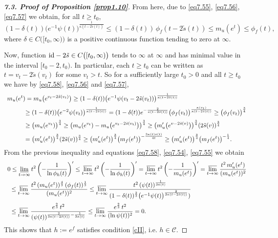 \documentclass[11pt, oneside]{amsart}
\begin{document}
\begin{proof}[{\bf 7.3. Proof of Proposition \ref{prop1.10}}]
From here, due to \eqref{eq7.55},  \eqref{eq7.56}, \eqref{eq7.57} we obtain, for all $t\ge t_0$, 
\begin{equation}\label{eq7.58}
(1-\delta(t))\bigl(e^{-1}\psi(t)\bigr)^{\frac{1}{\kappa(t-2\tilde s(t))}}\le (1-\delta(t))\,\phi_f(t-2\tilde s(t) )\le m_u(e^t)\le \phi_f(t),
\end{equation}
where $\delta\in C\bigl([t_0,\infty)\bigr)$ is a positive continuous function tending to zero at $\infty$.

Now, function ${\rm id}-2\tilde s\in C\bigl([t_0,\infty)\bigr)$ tends to $\infty$ at $\infty$ and has minimal value in the interval $[t_0-2, t_0)$. In particular, each $t\ge t_0$ can be written as $t=v_t-2\tilde s(v_t)$ for some $v_t> t$. So for a sufficiently large $t_0>0$ and all $t\ge t_0$ we have by \eqref{eq7.58}, \eqref{eq7.56} and \eqref{eq7.57},
\[
\begin{array}{l}
\displaystyle
m_u(e^t)=m_u\bigl(e^{v_t-2\tilde s(v_t)}\bigr)\ge 
(1-\delta(t))\bigl(e^{-1}\psi(v_t-2\tilde s(v_t))\bigr)^{\frac{1}{\kappa(t-2\tilde s(t))}}\medskip\\
\displaystyle \quad \qquad\ge (1-\delta(t))\bigl(e^{-2}\psi(v_t)\bigr)^{\frac{1}{\kappa(t-2\tilde s(t))}}=(1-\delta(t))e^{-\frac{2}{\kappa(t-2\tilde s(t))}}\bigr(\phi_f(v_t)\bigr)^{\frac{\kappa(v_t)}{\kappa(t-2\tilde s(t))}}\ge
\bigl(\phi_f(v_t)\bigr)^{\frac 34}\medskip\\
\displaystyle \quad\qquad\ge \bigl(m_u(e^{v_t})\bigr)^{\frac 34}\ge \bigl(m_u(e^{v_t})-m_u\bigl(e^{v_t-2\tilde s(v_t)}\bigr)\bigr)^{\frac 34}
\ge \bigl(m_u'\bigl(e^{v-2\tilde s(v)}\bigr)\bigr)^{\frac 34}(2\tilde s(v))^{\frac 34}\medskip\\
\displaystyle \qquad\quad=\bigl(m_u'(e^{t})\bigr)^{\frac 34} (2\tilde s(v))^{\frac 34}\ge \bigl(m_u'(e^{t})\bigr)^{\frac 34}\bigl(m_f(e^t)\bigr)^{-\frac{3\kappa(t)\varepsilon(t)}{4t}}\ge \bigl(m_u'(e^{t})\bigr)^{\frac 34}\bigl(m_f(e^t)\bigr)^{-\frac{1}{4}} .
\end{array}
\]
From the previous inequality and equations \eqref{eq7.58}, \eqref{eq7.54}, \eqref{eq7.55} we obtain
\[
\begin{array}{l}
\displaystyle
0\le \varliminf_{t\rightarrow\infty}t^2\left(-\frac{1}{\ln \phi_h(t)}\right)'\le \varlimsup_{t\rightarrow\infty}t^2\left(-\frac{1}{\ln \phi_h(t)}\right)'= \varlimsup_{t\rightarrow\infty}t^2\left(-\frac{1}{m_u(e^t)}\right)'=\varlimsup_{t\rightarrow\infty}\frac{t^2\, m_u'(e^t)}{(m_u(e^t))^2}\medskip\\
\displaystyle \ \ \le \varlimsup_{t\rightarrow\infty}\frac{t^2\, (m_u(e^t))^{\frac 43}\, (\phi_f(t))^{\frac 13}}{(m_u(e^t))^2}\le \varlimsup_{t\rightarrow\infty}\frac{t^2\, (\psi(t))^{\frac{1}{3\kappa(t)}}}{(1-\delta(t))^{\frac 23}\bigl(e^{-1}\psi(t)\bigr)^{\frac{2}{3\kappa(t-2\tilde s(t))}})}\medskip\\
\displaystyle \ \ \le
\varlimsup_{t\rightarrow\infty}\frac{e^{\frac 23}\,t^2}{(\psi(t))^{\frac{2}{3\kappa(t-2\tilde s(t))}-\frac{1}{3\kappa(t)}}}\le \varlimsup_{t\rightarrow\infty}\frac{e^{\frac 23}\,t^2}{(\ln\psi(t))^2}=0.
\end{array}
\]
This shows that $h:=e^f$ satisfies condition \eqref{cII}, i.e. $h\in\mathscr C$.


\end{proof}
\end{document}
